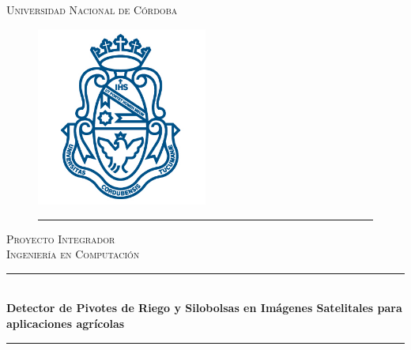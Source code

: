 \documentclass[runningheads]{llncs}
\begin{document}
\frontmatter %
\newcommand{\HRule}{\rule{\linewidth}{0.5mm}} %


\begin{titlepage}
\begin{center}
\textsc{\LARGE Universidad Nacional de Córdoba}\\ %

\begin{figure}[htbp]
	\centering
		\includegraphics[width=0.5\textwidth]{img/logo.png}
		\rule{35em}{0.5pt}
\end{figure}

\textsc{\Large Proyecto Integrador}\\[0.5cm] %
\textsc{\Large Ingeniería en Computación}\\[0.5cm] %

\HRule \\[0.4cm] %
{\LARGE \bfseries Detector de Pivotes de Riego y Silobolsas en Imágenes Satelitales para aplicaciones agrícolas
}\\[0.2cm] %
\HRule \\[1cm] %


\end{center}
\end{titlepage}
\end{document}

